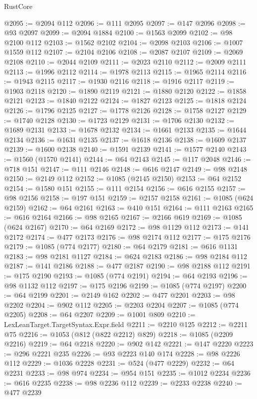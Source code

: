 \begin{lexlean}{RustCore}
\begin{coremodule}
@2095 := @2094 @112
@2096 := @111 @2095
@2097 := @147 @2096
@2098 := @93 @2097
@2099 := @2094 @1884
@2100 := @1563 @2099
@2102 := @98 @2100 @112
@2103 := @1562 @2102
@2104 := @2098 @2103
@2106 := @1007 @1559 @112
@2107 := @2104 @2106
@2108 := @2087 @2107
@2109 := @2069 @2108
@2110 := @2044 @2109
@2111 := @2023 @2110
@2112 := @2009 @2111
@2113 := @1996 @2112
@2114 := @1978 @2113
@2115 := @1965 @2114
@2116 := @1943 @2115
@2117 := @1930 @2116
@2118 := @1916 @2117
@2119 := @1903 @2118
@2120 := @1890 @2119
@2121 := @1880 @2120
@2122 := @1858 @2121
@2123 := @1840 @2122
@2124 := @1827 @2123
@2125 := @1818 @2124
@2126 := @1796 @2125
@2127 := @1778 @2126
@2128 := @1758 @2127
@2129 := @1740 @2128
@2130 := @1723 @2129
@2131 := @1706 @2130
@2132 := @1689 @2131
@2133 := @1678 @2132
@2134 := @1661 @2133
@2135 := @1644 @2134
@2136 := @1631 @2135
@2137 := @1618 @2136
@2138 := @1609 @2137
@2139 := @1600 @2138
@2140 := @1591 @2139
@2141 := @1577 @2140
@2143 := @1560 (@1570 @2141)
@2144 := @64 @2143
@2145 := @117 @2048
@2146 := @718 @151
@2147 := @111 @2146
@2148 := @616 @2147
@2149 := @98 @2148
@2150 := @2149 @112
@2152 := @1085 (@2145 @2150)
@2153 := @64 @2152
@2154 := @1580 @151
@2155 := @111 @2154
@2156 := @616 @2155
@2157 := @98 @2156
@2158 := @197 @151
@2159 := @2157 @2158
@2161 := @1085 (@624 @2159)
@2162 := @64 @2161
@2163 := @410 @151
@2164 := @111 @2163
@2165 := @616 @2164
@2166 := @98 @2165
@2167 := @2166 @619
@2169 := @1085 (@624 @2167)
@2170 := @64 @2169
@2172 := @98 @1129 @112
@2173 := @141 @2172
@2174 := @477 @2173
@2176 := @98 @2174 @112
@2177 := @175 @2176
@2179 := @1085 (@774 @2177)
@2180 := @64 @2179
@2181 := @616 @1131
@2183 := @98 @2181 @1127
@2184 := @624 @2183
@2186 := @98 @2184 @112
@2187 := @141 @2186
@2188 := @477 @2187
@2190 := @98 @2188 @112
@2191 := @175 @2190
@2193 := @1085 (@774 @2191)
@2194 := @64 @2193
@2196 := @98 @1132 @112
@2197 := @175 @2196
@2199 := @1085 (@774 @2197)
@2200 := @64 @2199
@2201 := @2149 @162
@2202 := @477 @2201
@2203 := @98 @2202
@2204 := @902 @112
@2205 := @2203 @2204
@2207 := @1085 (@774 @2205)
@2208 := @64 @2207
@2209 := @1001 @809
@2210 := LexLeanTarget.TargetSyntax.Expr.field
@2211 := @2210 @125
@2212 := @2211 @75
@2216 := @1053 (@812 (@822 @2212) @829)
@2218 := @1085 (@2209 @2216)
@2219 := @64 @2218
@2220 := @902 @142
@2221 := @147 @2220
@2223 := @296 @2221 @235
@2226 := @93 @2223 @140 @174
@2228 := @98 @2226 @112
@2229 := @1036 @2228
@2231 := @524 (@477 @2229)
@2232 := @64 @2231
@2233 := @98 @974
@2234 := @954 @151
@2235 := @1012 @2234
@2236 := @616 @2235
@2238 := @98 @2236 @112
@2239 := @2233 @2238
@2240 := @477 @2239

\end{coremodule}
\end{lexlean}
